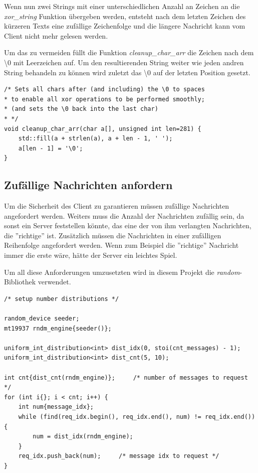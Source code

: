 \documentclass[]{article}
\begin{document}
Wenn nun zwei Strings mit einer unterschiedlichen Anzahl an Zeichen an die \textit{xor\_string} Funktion übergeben werden, entsteht nach dem letzten Zeichen des kürzeren Texts eine zufällige Zeichenfolge und die längere Nachricht kann vom Client nicht mehr gelesen werden.

Um das zu vermeiden füllt die Funktion \textit{cleanup\_char\_arr} die Zeichen nach dem \textbackslash 0 mit Leerzeichen auf. Um den resultierenden String weiter wie jeden andren String behandeln zu können wird zuletzt das \textbackslash 0 auf der letzten Position gesetzt.

\begin{lstlisting}
/* Sets all chars after (and including) the \0 to spaces
* to enable all xor operations to be performed smoothly;
* (and sets the \0 back into the last char)
* */
void cleanup_char_arr(char a[], unsigned int len=281) {
	std::fill(a + strlen(a), a + len - 1, ' ');
	a[len - 1] = '\0';
}
\end{lstlisting}

\subsection{Zufällige Nachrichten anfordern}
Um die Sicherheit des Client zu garantieren müssen zufällige Nachrichten angefordert werden. Weiters muss die Anzahl der Nachrichten zufällig sein, da sonst ein Server feststellen könnte, das eine der von ihm verlangten Nachrichten, die ''richtige'' ist. Zusätzlich müssen die Nachrichten in einer zufälligen Reihenfolge angefordert werden. Wenn zum Beispiel die ''richtige'' Nachricht immer die erste wäre, hätte der Server ein leichtes Spiel.

Um all diese Anforderungen umzusetzten wird in diesem Projekt die \textit{random}-Bibliothek verwendet.

\begin{lstlisting}
/* setup number distributions */

random_device seeder;
mt19937 rndm_engine{seeder()};

uniform_int_distribution<int> dist_idx(0, stoi(cnt_messages) - 1);
uniform_int_distribution<int> dist_cnt(5, 10);

int cnt{dist_cnt(rndm_engine)};     /* number of messages to request */
for (int i{}; i < cnt; i++) {
	int num{message_idx};
	while (find(req_idx.begin(), req_idx.end(), num) != req_idx.end()) {
		num = dist_idx(rndm_engine);
	}
	req_idx.push_back(num);     /* message idx to request */
}
\end{lstlisting}
\end{document}
